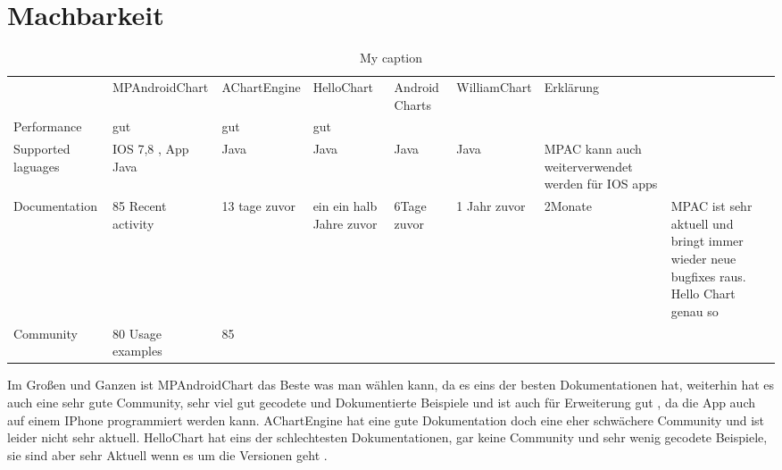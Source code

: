 \chapter{Machbarkeit }
\begin{table}[]
\centering
\caption{My caption}
\label{my-label}
\begin{tabular}{lllll}
 & MPAndroidChart & AChartEngine & HelloChart & Android Charts& WilliamChart & Erklärung \\
Performance & gut & gut & gut &  \\
Supported laguages & IOS 7,8 , App Java & Java & Java & Java & Java & MPAC kann auch weiterverwendet werden für IOS apps \\
Documentation & 85 %
Recent activity & 13 tage zuvor & ein ein halb Jahre zuvor & 6Tage zuvor & 1 Jahr zuvor & 2Monate & MPAC ist sehr aktuell und bringt immer wieder neue bugfixes raus. Hello Chart genau so \\
Community & 80%
Usage examples & 85%
\end{tabular}
\end{table}

Im Großen und Ganzen ist MPAndroidChart das Beste was man wählen kann, da es eins der besten Dokumentationen hat, weiterhin hat es auch eine sehr gute Community, sehr viel gut gecodete und Dokumentierte Beispiele und ist auch für Erweiterung gut , da die App auch auf einem IPhone programmiert werden kann. 
AChartEngine hat eine gute Dokumentation doch eine eher schwächere Community und ist leider nicht sehr aktuell. 
HelloChart hat eins der schlechtesten Dokumentationen, gar keine Community und sehr wenig gecodete Beispiele, sie sind aber sehr Aktuell wenn es um die Versionen geht .
 